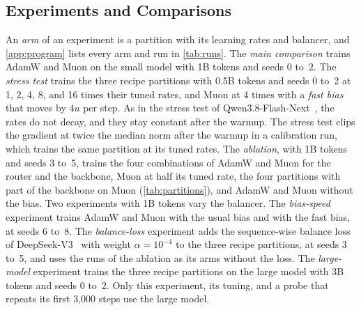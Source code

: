 \documentclass[11pt, a4paper]{article}
\begin{document}
\subsection{Experiments and Comparisons}
\label{sec:experiments}

An \emph{arm} of an experiment is a partition with its learning rates and balancer, and \cref{app:program} lists every arm and run in \cref{tab:runs}. The \emph{main comparison} trains AdamW and Muon on the small model with 1B tokens and seeds 0 to~2. The \emph{stress test} trains the three recipe partitions with 0.5B tokens and seeds 0 to~2 at 1, 2, 4, 8, and 16 times their tuned rates, and Muon at 4 times with a \emph{fast bias} that moves by $4u$ per step. As in the stress test of Qwen3.8-Flash-Next~\citep{qiu2026qwennext}, the rates do not decay, and they stay constant after the warmup. The stress test clips the gradient at twice the median norm after the warmup in a calibration run, which trains the same partition at its tuned rates. The \emph{ablation}, with 1B tokens and seeds 3 to~5, trains the four combinations of AdamW and Muon for the router and the backbone, Muon at half its tuned rate, the four partitions with part of the backbone on Muon (\cref{tab:partitions}), and AdamW and Muon without the bias. Two experiments with 1B tokens vary the balancer. The \emph{bias-speed} experiment trains AdamW and Muon with the usual bias and with the fast bias, at seeds 6 to~8. The \emph{balance-loss} experiment adds the sequence-wise balance loss of DeepSeek-V3~\citep{deepseek2024v3} with weight $\alpha = 10^{-4}$ to the three recipe partitions, at seeds 3 to~5, and uses the runs of the ablation as its arms without the loss. The \emph{large-model} experiment trains the three recipe partitions on the large model with 3B tokens and seeds 0 to~2. Only this experiment, its tuning, and a probe that repeats its first 3,000 steps use the large model.
\end{document}
